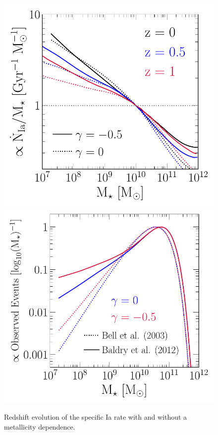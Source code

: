 \documentclass[ms.tex]{subfiles}
\begin{document}
\begin{itemize}
\begin{figure}
\centering
\includegraphics[scale = 0.56]{umachine_iarate_redshiftevol.pdf}
\includegraphics[scale = 0.55]{ia_massdist.pdf}
\caption{
Redshift evolution of the specific Ia rate with and without a metallicity
dependence.
}
\label{fig:specia_zdep}
\end{figure}


\end{itemize}
\end{document}
